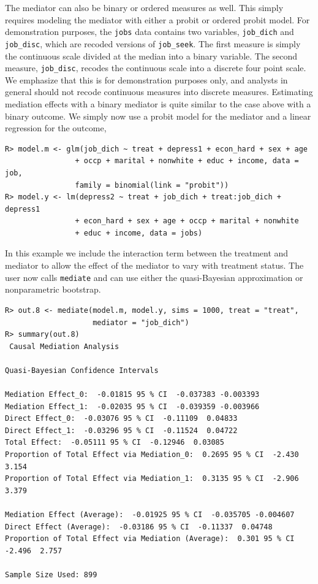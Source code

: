 \documentclass[11pt,letterpaper]{article}
\theoremstyle{plain}
\begin{document}
The mediator can also be binary or ordered measures as well.  This
simply requires modeling the mediator with either a probit or ordered
probit model.  For demonstration purposes, the \texttt{jobs} data
contains two variables, \texttt{job\_dich} and \texttt{job\_disc},
which are recoded versions of \texttt{job\_seek}.  The first measure
is simply the continuous scale divided at the median into a binary
variable.  The second measure, \texttt{job\_disc}, recodes the
continuous scale into a discrete four point scale.  We emphasize that
this is for demonstration purposes only, and analysts in general
should not recode continuous measures into discrete measures.
Estimating mediation effects with a binary mediator is quite similar
to the case above with a binary outcome.  We simply now use a probit
model for the mediator and a linear regression for the outcome,
\begin{verbatim}
R> model.m <- glm(job_dich ~ treat + depress1 + econ_hard + sex + age
                + occp + marital + nonwhite + educ + income, data = job, 
                family = binomial(link = "probit"))
R> model.y <- lm(depress2 ~ treat + job_dich + treat:job_dich + depress1
                + econ_hard + sex + age + occp + marital + nonwhite 
                + educ + income, data = jobs)
\end{verbatim}

In this example we include the interaction term between the treatment and
mediator to allow the effect of the mediator to vary with
treatment status.  The user now calls \texttt{mediate} and can use
either the quasi-Bayesian approximation or nonparametric bootstrap.
\begin{verbatim}
R> out.8 <- mediate(model.m, model.y, sims = 1000, treat = "treat",
                    mediator = "job_dich")
R> summary(out.8)
 Causal Mediation Analysis 

Quasi-Bayesian Confidence Intervals

Mediation Effect_0:  -0.01815 95 % CI  -0.037383 -0.003393 
Mediation Effect_1:  -0.02035 95 % CI  -0.039359 -0.003966 
Direct Effect_0:  -0.03076 95 % CI  -0.11109  0.04833 
Direct Effect_1:  -0.03296 95 % CI  -0.11524  0.04722 
Total Effect:  -0.05111 95 % CI  -0.12946  0.03085 
Proportion of Total Effect via Mediation_0:  0.2695 95 % CI  -2.430  3.154 
Proportion of Total Effect via Mediation_1:  0.3135 95 % CI  -2.906  3.379 

Mediation Effect (Average):  -0.01925 95 % CI  -0.035705 -0.004607 
Direct Effect (Average):  -0.03186 95 % CI  -0.11337  0.04748 
Proportion of Total Effect via Mediation (Average):  0.301 95 % CI  -2.496  2.757 

Sample Size Used: 899 
\end{verbatim}
\end{document}
